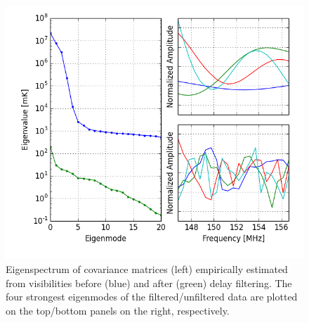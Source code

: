 \documentclass[twocolumn,numberedappendix]{emulateapj} \shorttitle{PSA64}
\begin{document}
\begin{figure}[t!]\centering
\includegraphics[width=1.5\columnwidth]{plots/eig.png}
\caption{
Eigenspectrum of covariance matrices (left) empirically estimated 
from visibilities before (blue) and after (green) delay filtering.
The four strongest eigenmodes of the filtered/unfiltered data are plotted
on the top/bottom panels on the right, respectively.
} \label{fig:eigs}
\end{figure}
\end{document}
